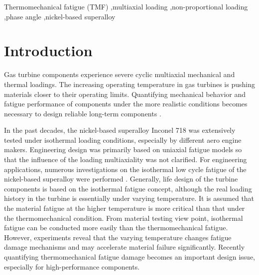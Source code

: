 \documentclass[preprint,5p,twocolumn,11pt,sort&compress]{elsarticle}
\begin{document}
\begin{frontmatter}
\begin{abstract}
\end{abstract}

%
\begin{keyword}
Thermomechanical fatigue (TMF) \sep multiaxial loading \sep non-proportional loading \sep phase angle \sep nickel-based superalloy

\end{keyword}
\end{frontmatter}

\section{Introduction}
Gas turbine components experience severe cyclic multiaxial mechanical and thermal loadings. The increasing operating temperature in gas turbines is pushing materials closer to their operating limits. Quantifying mechanical behavior and fatigue performance of components under the more realistic conditions becomes necessary to design reliable long-term components  \cite{Harrison1996}.

In the past decades, the nickel-based superalloy Inconel 718 was extensively tested under isothermal loading conditions, especially by different aero engine makers. Engineering design was primarily based on uniaxial fatigue models so that the influence of the loading multiaxiality was not clarified.
For engineering applications, numerous investigations on the isothermal low cycle fatigue of the nickel-based superalloy were performed \cite{Koch85, Morrow88, Mahobia2014, Chen2016, William1995, kim1988elevated, nelson1992creep}. 
Generally, life design of the turbine components is based on the isothermal fatigue concept, although the real loading history in the turbine is essentially under varying temperature. It is assumed that the material fatigue at the higher temperature is more critical than that under the thermomechanical condition. From material testing view point, isothermal fatigue can be conducted more easily than the thermomechanical fatigue. However, experiments reveal that the varying temperature changes fatigue damage mechanisms and may accelerate material failure significantly. Recently quantifying thermomechanical fatigue damage becomes an important design issue, especially for high-performance components.
\end{document}
